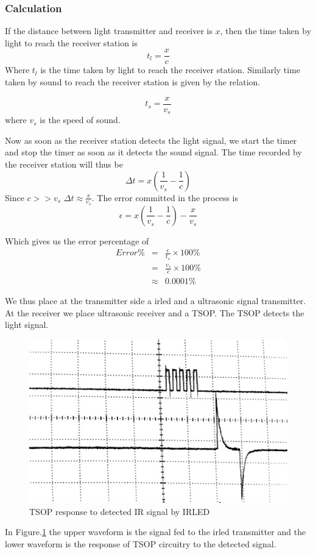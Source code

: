 \subsubsection{Calculation}
If the distance between light transmitter and receiver is $x$, then the time taken by light to reach the receiver station is 
\begin{equation}
	t_l = \frac{x}{c}
\end{equation}
Where $t_l$ is the time taken by light to reach the receiver station. Similarly time taken by sound to reach the receiver station is given by the relation.

\begin{equation}
	t_s = \frac{x}{v_s}
\end{equation}
where $v_s$ is the speed of sound.

Now as soon as the receiver station detects the light signal, we start the timer and stop the timer as soon as it detects the sound signal.
The time recorded by the receiver station will thus be 
\begin{equation} \label{eq:deltaT}
	\Delta t = x\left( \frac{1}{v_s}- \frac{1}{c}\right)
\end{equation}
Since $c >> v_s$ $\Delta t \approx \frac{x}{v_s}$. 
The error committed in the process is 
\begin{equation} 
	\epsilon = x\left( \frac{1}{v_s}- \frac{1}{c}\right) - \frac{x}{v_s}
\end{equation}

Which gives us the error percentage of 
\begin{eqnarray*}
	Error \% & =& \frac{\epsilon}{t_s}\times 100\%\\
	{}& = & \frac{v_s}{c} \times 100 \%\\
	{}& \approx & 0.0001\% 
\end{eqnarray*}

We thus place at the transmitter side a \gls{irled} and a ultrasonic signal transmitter. At the receiver we place ultrasonic receiver and a TSOP. The TSOP detects the light signal.

\begin{figure}
	\centering
	\includegraphics[width=120mm]{Images/DetectionByTSOP.jpg}
	\caption{TSOP response to detected IR signal by IRLED}
	\label{fig:DetectionByTSOP}
\end{figure} 
In Figure.\ref{fig:DetectionByTSOP} the upper waveform is the signal fed to the \gls{irled} transmitter and the lower waveform is the response of TSOP circuitry to the detected signal.

